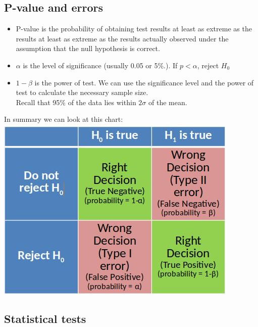 \documentclass[12pt]{book}
\begin{document}
\subsection*{P-value and errors}

\begin{itemize}
  \item P-value is the probability of obtaining test results at least as extreme as the results at least as extreme as the results actually observed under the assumption that the null hypothesis is correct.
  \item $\alpha$ is the level of significance (usually 0.05 or 5\%.). If $p<\alpha$, reject $H_0$
  \item $1-\beta$ is the power of test. We can use the significance level and the power of test to calculate the necessary sample size.\\ Recall that 95\% of the data lies within $2\sigma$ of the mean.
  
\end{itemize}
In summary we can look at this chart:\\
\includegraphics*[width=\textwidth]{chart}

\subsection*{Statistical tests}
\end{document}
